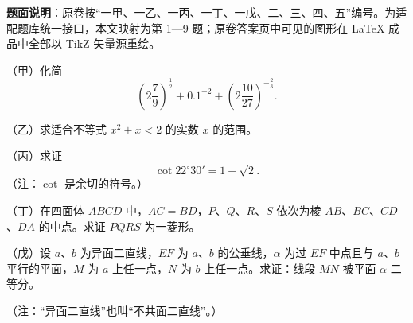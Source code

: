 

\begin{gktip}
\textbf{题面说明}：原卷按“一甲、一乙、一丙、一丁、一戊、二、三、四、五”编号。为适配题库统一接口，本文映射为第 1—9 题；原卷答案页中可见的图形在 LaTeX 成品中全部以 TikZ 矢量源重绘。
\end{gktip}


\begin{question}
（甲）化简
\nopagebreak[4]
\[
\left(2\frac79\right)^{\frac12}+0.1^{-2}+\left(2\frac{10}{27}\right)^{-\frac23}.
\]

\end{question}
\begin{question}
（乙）求适合不等式 $x^2+x<2$ 的实数 $x$ 的范围。

\end{question}
\begin{question}
（丙）求证
\nopagebreak[4]
\[
\cot22^\circ30'=1+\sqrt2.
\]
（注：$\cot$ 是余切的符号。）

\end{question}
\begin{question}
（丁）在四面体 $ABCD$ 中，$AC=BD$，$P$、$Q$、$R$、$S$ 依次为棱 $AB$、$BC$、$CD$、$DA$ 的中点。求证 $PQRS$ 为一菱形。

\end{question}
\begin{question}
（戊）设 $a$、$b$ 为异面二直线，$EF$ 为 $a$、$b$ 的公垂线，$\alpha$ 为过 $EF$ 中点且与 $a$、$b$ 平行的平面，$M$ 为 $a$ 上任一点，$N$ 为 $b$ 上任一点。求证：线段 $MN$ 被平面 $\alpha$ 二等分。

（注：“异面二直线”也叫“不共面二直线”。）

\end{question}

